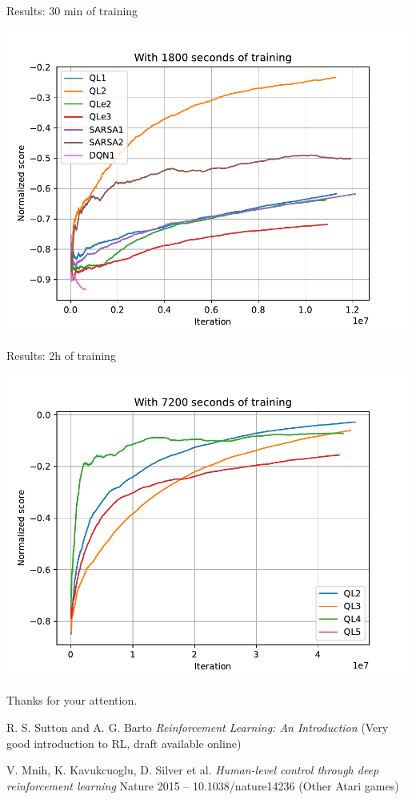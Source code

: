 \documentclass[serif, 11pt]{beamer}
\begin{document}
\begin{frame}{Results: 30 min of training}
	\begin{center}
		\includegraphics[width=.9\linewidth]{score-1800.pdf}
	\end{center}
\end{frame}

\begin{frame}{Results: 2h of training}
	\begin{center}
		\includegraphics[width=.9\linewidth]{score-7200.pdf}
	\end{center}
\end{frame}


\begin{frame}
\begin{center}
Thanks for your attention.
\end{center}
\vspace{1em}
\begin{thebibliography}{9}

R. S. Sutton and A. G. Barto
\textsl{Reinforcement Learning: An Introduction}
{\footnotesize (Very good introduction to RL, draft available online)}

V. Mnih, K. Kavukcuoglu, D. Silver et al.
\textsl{Human-level control through deep reinforcement learning}
Nature 2015 -- 10.1038/nature14236
{\footnotesize (Other Atari games)}

\end{thebibliography}

\end{frame}
\end{document}
